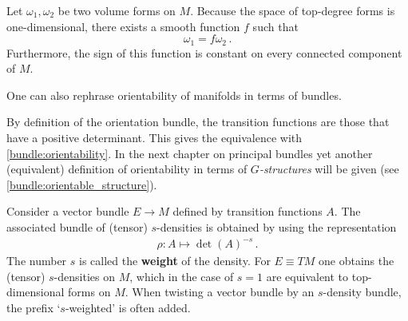     \begin{property}
        Let $\omega_1,\omega_2$ be two volume forms on $M$. Because the space of top-degree forms is one-dimensional, there exists a smooth function $f$ such that \[\omega_1 = f\omega_2\,.\] Furthermore, the sign of this function is constant on every connected component of $M$.
    \end{property}

    One can also rephrase orientability of manifolds in terms of bundles.

    \begin{remark}
        By definition of the orientation bundle, the transition functions are those that have a positive determinant. This gives the equivalence with \cref{bundle:orientability}. In the next chapter on principal bundles yet another (equivalent) definition of orientability in terms of \textit{$G$-structures} will be given (see \cref{bundle:orientable_structure}).
    \end{remark}

    \begin{definition}\label{bundle:density}
        Consider a vector bundle $E\rightarrow M$ defined by transition functions $A$. The associated bundle of (tensor) $s$-densities is obtained by using the representation
        \begin{gather}
            \rho:A\mapsto\det(A)^{-s}\,.
        \end{gather}
        The number $s$ is called the \textbf{weight} of the density. For $E\equiv TM$ one obtains the (tensor) $s$-densities on $M$, which in the case of $s=1$ are equivalent to top-dimensional forms on $M$. When twisting a vector bundle by an $s$-density bundle, the prefix `$s$-weighted' is often added.
    \end{definition}

